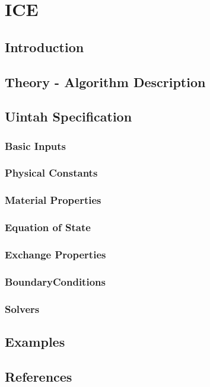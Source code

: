 
\section{ICE}

\subsection{Introduction}

\subsection{Theory - Algorithm Description}

\subsection{Uintah Specification}

\subsubsection{Basic Inputs}
\subsubsection{Physical Constants}
\subsubsection{Material Properties}
\subsubsection{Equation of State}
\subsubsection{Exchange Properties}
\subsubsection{BoundaryConditions}
\subsubsection{Solvers}

\subsection{Examples}

\subsection{References}
